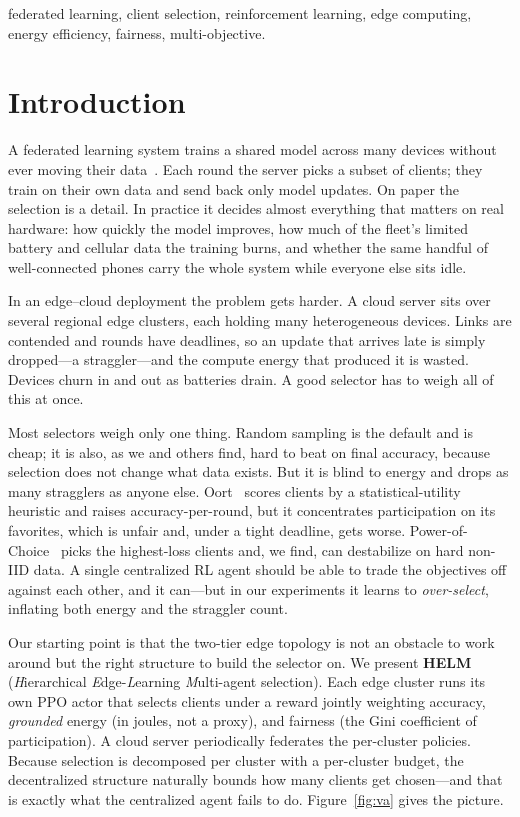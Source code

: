 \documentclass[conference]{IEEEtran}
\begin{document}
\begin{IEEEkeywords}
federated learning, client selection, reinforcement learning, edge computing,
energy efficiency, fairness, multi-objective.
\end{IEEEkeywords}

\section{Introduction}
A federated learning system trains a shared model across many devices without
ever moving their data~\cite{mcmahan2017}. Each round the server picks a subset
of clients; they train on their own data and send back only model updates. On
paper the selection is a detail. In practice it decides almost everything that
matters on real hardware: how quickly the model improves, how much of the fleet's
limited battery and cellular data the training burns, and whether the same
handful of well-connected phones carry the whole system while everyone else sits
idle.

In an edge--cloud deployment the problem gets harder. A cloud server sits over
several regional edge clusters, each holding many heterogeneous devices. Links
are contended and rounds have deadlines, so an update that arrives late is simply
dropped---a straggler---and the compute energy that produced it is wasted.
Devices churn in and out as batteries drain. A good selector has to weigh all of
this at once.

Most selectors weigh only one thing. Random sampling is the default and is
cheap; it is also, as we and others find, hard to beat on final accuracy, because
selection does not change what data exists. But it is blind to energy and drops
as many stragglers as anyone else. Oort~\cite{oort} scores clients by a
statistical-utility heuristic and raises accuracy-per-round, but it concentrates
participation on its favorites, which is unfair and, under a tight deadline, gets
worse. Power-of-Choice~\cite{poc} picks the highest-loss clients and, we find,
can destabilize on hard non-IID data. A single centralized RL agent should be
able to trade the objectives off against each other, and it can---but in our
experiments it learns to \emph{over-select}, inflating both energy and the
straggler count.

Our starting point is that the two-tier edge topology is not an obstacle to work
around but the right structure to build the selector on. We present
\textbf{HELM} (\emph{H}ierarchical \emph{E}dge-\emph{L}earning \emph{M}ulti-agent
selection). Each edge cluster runs its own PPO actor that selects clients under a
reward jointly weighting accuracy, \emph{grounded} energy (in joules, not a
proxy), and fairness (the Gini coefficient of participation). A cloud server
periodically federates the per-cluster policies. Because selection is decomposed
per cluster with a per-cluster budget, the decentralized structure naturally
bounds how many clients get chosen---and that is exactly what the centralized
agent fails to do. Figure~\ref{fig:va} gives the picture.
\end{document}
